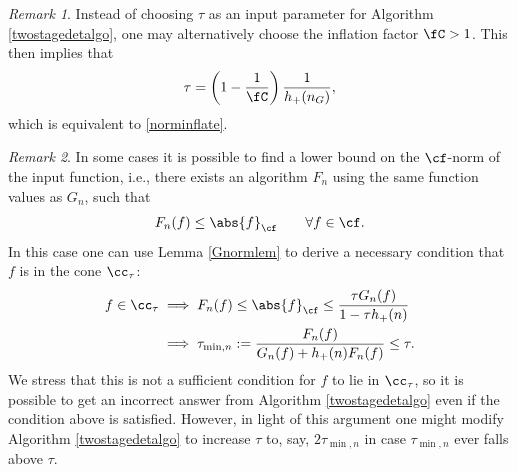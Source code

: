 \documentclass[]{elsarticle}
\theoremstyle{definition}
\theoremstyle{remark}
\newtheorem{rem}{Remark}
\newcommand{\Fnorm}[1]{\abs{#1}_{\cf}}
\begin{document}
\begin{rem} Instead of choosing $\tau$ as an input parameter for Algorithm \ref{twostagedetalgo}, one may alternatively choose the inflation factor $\fC >1$.  This then implies that 
\begin{equation} \label{taufromnC}
\tau = \left(1 - \frac{1}{\fC}\right)\frac{1}{h_{+}(n_G)},
\end{equation}
which is equivalent to \eqref{norminflate}.
\end{rem}

\begin{rem} \label{neccondrem} In some cases it is possible to find a lower bound on the $\cf$-norm of the input function, i.e., there exists an algorithm $F_n$ using the same function values as $G_n$, such that
\[
F_n(f) \le \Fnorm{f} \qquad \forall f \in \cf.
\]
In this case one can use Lemma \ref{Gnormlem} to derive a necessary condition that $f$ is in the cone $\cc_\tau$:
\begin{align}
\nonumber
f \in \cc_\tau 
& \implies F_n(f) \le \Fnorm{f} \le \frac{\tau G_n(f)}{1-\tau h_+(n)}\\
& \implies \tau_{\min,n}:= \frac{F_n(f)}{G_n(f) + h_+(n) F_n(f)} \le \tau.
\label{neccondFn}
\end{align}
We stress that this is not a sufficient condition for $f$ to lie in $\cc_{\tau}$, so it is possible to get an incorrect answer from Algorithm \ref{twostagedetalgo} even if the condition above is satisfied.  However, in light of this argument one might modify Algorithm \ref{twostagedetalgo} to increase $\tau$ to, say, $2 \tau_{\min,n}$ in case $\tau_{\min,n}$ ever falls above $\tau$.
\end{rem}
\end{document}
